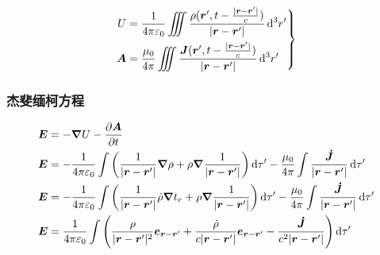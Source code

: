 \begin{equation}
    \left.\begin{aligned}
        U&=\frac{1}{4\pi\varepsilon_0}\iiint\frac{\rho(\boldsymbol{r}', t-\frac{\vert{}\boldsymbol{r} - \boldsymbol{r}'\vert{}}{c})}{\vert{}\boldsymbol{r} - \boldsymbol{r}'\vert{}}\dif ^3r'\\
        \boldsymbol{A}&=\frac{\mu_0}{4\pi}\iiint\frac{\boldsymbol{J}(\boldsymbol{r}', t-\frac{\vert{}\boldsymbol{r} - \boldsymbol{r}'\vert{}}{c})}{\vert{}\boldsymbol{r} - \boldsymbol{r}'\vert{}}\dif ^3r'\\
    \end{aligned}\right\}
\end{equation}
\subsubsection{杰斐缅柯方程}
\begin{align}
    \boldsymbol{E}&=-\boldsymbol{\nabla}U-\frac{\partial\boldsymbol{A}}{\partial t}\nonumber\\
    \boldsymbol{E}&=-\frac{1}{4\pi\varepsilon_0}\int\left(\frac{1}{\vert{}\boldsymbol{r} - \boldsymbol{r}'\vert{}}\boldsymbol{\nabla}\rho+\rho\boldsymbol{\nabla}\frac{1}{\vert{}\boldsymbol{r} - \boldsymbol{r}'\vert{}}\right)\dif\tau'-\frac{\mu_0}{4\pi}\int\frac{\boldsymbol{\dot J}}{\vert{}\boldsymbol{r} - \boldsymbol{r}'\vert{}}\dif\tau'\nonumber\\
    \boldsymbol{E}&=-\frac{1}{4\pi\varepsilon_0}\int\left(\frac{1}{\vert{}\boldsymbol{r} - \boldsymbol{r}'\vert{}}\dot{\rho}\boldsymbol{\nabla}t_r+\rho\boldsymbol{\nabla}\frac{1}{\vert{}\boldsymbol{r} - \boldsymbol{r}'\vert{}}\right)\dif\tau'-\frac{\mu_0}{4\pi}\int\frac{\boldsymbol{\dot J}}{\vert{}\boldsymbol{r} - \boldsymbol{r}'\vert{}}\dif\tau'\nonumber\\
    \boldsymbol{E}&=\frac{1}{4\pi\varepsilon_0}\int\left(\frac{\rho}{\vert{}\boldsymbol{r} - \boldsymbol{r}'\vert{}^2}\boldsymbol{e}_{\boldsymbol{r} - \boldsymbol{r}'}
    +\frac{\dot{\rho}}{c\vert{}\boldsymbol{r} - \boldsymbol{r}'\vert{}}\boldsymbol{e}_{\boldsymbol{r} - \boldsymbol{r}'}
    -\frac{\boldsymbol{\dot J}}{c^2\vert{}\boldsymbol{r} - \boldsymbol{r}'\vert{}}\right)\dif\tau'
\end{align}
